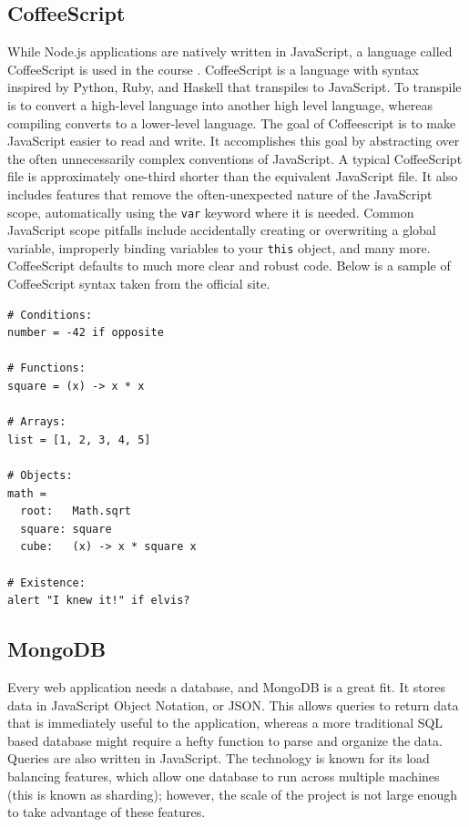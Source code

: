 \documentclass[12pt]{article}
\newcommand{\code}[1]{{\texttt {#1}}}
\begin{document}
\subsection{CoffeeScript}\label{sec:coffee}
While Node.js applications are natively written in JavaScript, a language called CoffeeScript\cite{CoffeeScript} is used in the course \cite{CoffeeScript}. CoffeeScript is a language with syntax inspired by Python, Ruby, and Haskell that transpiles to JavaScript. To transpile is to convert a high-level language into another high level language, whereas compiling converts to a lower-level language. The goal of Coffeescript is to make JavaScript easier to read and write. It accomplishes this goal by abstracting over the often unnecessarily complex conventions of JavaScript. A typical CoffeeScript file is approximately one-third shorter than the equivalent JavaScript file. It also includes features that remove the often-unexpected nature of the JavaScript scope, automatically using the \code{var} keyword where it is needed. Common JavaScript scope pitfalls include accidentally creating or overwriting a global variable, improperly binding variables to your \code{this} object, and many more. CoffeeScript defaults to much more clear and robust code. Below is a sample of CoffeeScript syntax taken from the official site.
\begin{verbatim}
# Conditions:
number = -42 if opposite

# Functions:
square = (x) -> x * x

# Arrays:
list = [1, 2, 3, 4, 5]

# Objects:
math =
  root:   Math.sqrt
  square: square
  cube:   (x) -> x * square x

# Existence:
alert "I knew it!" if elvis?

\end{verbatim}

\subsection{MongoDB}\label{sec:mongo}
Every web application needs a database, and MongoDB\cite{MongoDB} is a great fit. It stores data in JavaScript Object Notation, or JSON. This allows queries to return data that is immediately useful to the application, whereas a more traditional SQL based database might require a hefty function to parse and organize the data. Queries are also written in JavaScript. The technology is known for its  load balancing features, which allow one database to run across multiple machines (this is known as sharding); however, the scale of the project is not large enough to take advantage of these features.
\end{document}
